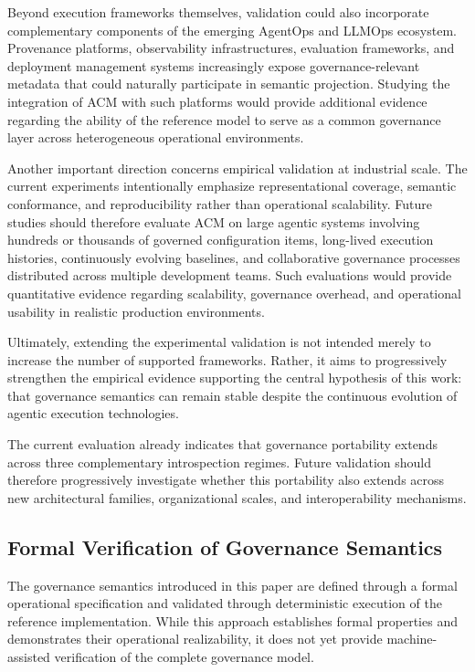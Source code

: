 \documentclass[10pt]{article}
\begin{document}
Beyond execution frameworks themselves, validation could also incorporate complementary components of the emerging AgentOps and LLMOps ecosystem. Provenance platforms, observability infrastructures, evaluation frameworks, and deployment management systems increasingly expose governance-relevant metadata that could naturally participate in semantic projection. Studying the integration of ACM with such platforms would provide additional evidence regarding the ability of the reference model to serve as a common governance layer across heterogeneous operational environments.

Another important direction concerns empirical validation at industrial scale. The current experiments intentionally emphasize representational coverage, semantic conformance, and reproducibility rather than operational scalability. Future studies should therefore evaluate ACM on large agentic systems involving hundreds or thousands of governed configuration items, long-lived execution histories, continuously evolving baselines, and collaborative governance processes distributed across multiple development teams. Such evaluations would provide quantitative evidence regarding scalability, governance overhead, and operational usability in realistic production environments.

Ultimately, extending the experimental validation is not intended merely to increase the number of supported frameworks. Rather, it aims to progressively strengthen the empirical evidence supporting the central hypothesis of this work: that governance semantics can remain stable despite the continuous evolution of agentic execution technologies.

The current evaluation already indicates that governance portability extends across three complementary introspection regimes. Future validation should therefore progressively investigate whether this portability also extends across new architectural families, organizational scales, and interoperability mechanisms.

\subsection{Formal Verification of Governance Semantics}
\label{sec:future_formal_verification}

The governance semantics introduced in this paper are defined through a formal operational specification and validated through deterministic execution of the reference implementation. While this approach establishes formal properties and demonstrates their operational realizability, it does not yet provide machine-assisted verification of the complete governance model.
\end{document}
